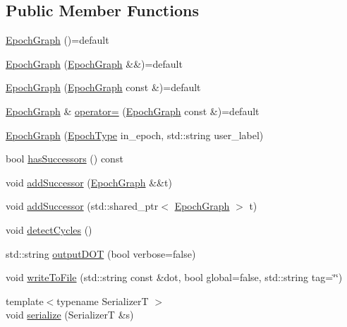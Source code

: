 \subsection*{Public Member Functions}
\begin{DoxyCompactItemize}
\item 
\hyperlink{structvt_1_1termination_1_1graph_1_1_epoch_graph_a2ad0e6af761b4ff43605ad9d3f33d709}{Epoch\+Graph} ()=default
\item 
\hyperlink{structvt_1_1termination_1_1graph_1_1_epoch_graph_a84f82857261951f8ec3670e6f5378898}{Epoch\+Graph} (\hyperlink{structvt_1_1termination_1_1graph_1_1_epoch_graph}{Epoch\+Graph} \&\&)=default
\item 
\hyperlink{structvt_1_1termination_1_1graph_1_1_epoch_graph_aabf50c2ebc474b7683742fe1e9d8d25a}{Epoch\+Graph} (\hyperlink{structvt_1_1termination_1_1graph_1_1_epoch_graph}{Epoch\+Graph} const \&)=default
\item 
\hyperlink{structvt_1_1termination_1_1graph_1_1_epoch_graph}{Epoch\+Graph} \& \hyperlink{structvt_1_1termination_1_1graph_1_1_epoch_graph_a5039bbba31fdc12c8f815c2621aa5722}{operator=} (\hyperlink{structvt_1_1termination_1_1graph_1_1_epoch_graph}{Epoch\+Graph} const \&)=default
\item 
\hyperlink{structvt_1_1termination_1_1graph_1_1_epoch_graph_a0c6ff768e115c90aaaaf72d390c5df42}{Epoch\+Graph} (\hyperlink{namespacevt_a81d11b28122d43bf9834577e4a06440f}{Epoch\+Type} in\+\_\+epoch, std\+::string user\+\_\+label)
\item 
bool \hyperlink{structvt_1_1termination_1_1graph_1_1_epoch_graph_a1ab5f8a6b8107f2f08216f6036a81aa8}{has\+Successors} () const
\item 
void \hyperlink{structvt_1_1termination_1_1graph_1_1_epoch_graph_a5cce93e76f25941872d9176c8f3d6770}{add\+Successor} (\hyperlink{structvt_1_1termination_1_1graph_1_1_epoch_graph}{Epoch\+Graph} \&\&t)
\item 
void \hyperlink{structvt_1_1termination_1_1graph_1_1_epoch_graph_a9d611bd2b00472b7a66adc68aa86ff7f}{add\+Successor} (std\+::shared\+\_\+ptr$<$ \hyperlink{structvt_1_1termination_1_1graph_1_1_epoch_graph}{Epoch\+Graph} $>$ t)
\item 
void \hyperlink{structvt_1_1termination_1_1graph_1_1_epoch_graph_ab1b5d635c0d47e17fe1b5302370bf2d0}{detect\+Cycles} ()
\item 
std\+::string \hyperlink{structvt_1_1termination_1_1graph_1_1_epoch_graph_a75bdd706336677de5f3d5eb13428cf08}{output\+D\+OT} (bool verbose=false)
\item 
void \hyperlink{structvt_1_1termination_1_1graph_1_1_epoch_graph_a10aa0f193aeeb2f9389bff1bc6a4e4fc}{write\+To\+File} (std\+::string const \&dot, bool global=false, std\+::string tag=\char`\"{}\char`\"{})
\item 
{\footnotesize template$<$typename SerializerT $>$ }\\void \hyperlink{structvt_1_1termination_1_1graph_1_1_epoch_graph_aaa36d3e3ff2dc34ba2a36efbac7d7f16}{serialize} (SerializerT \&s)
\end{DoxyCompactItemize}
